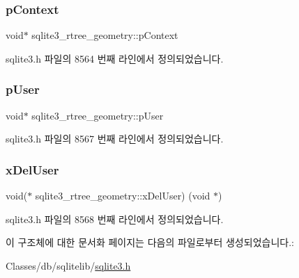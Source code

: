 \subsubsection{\texorpdfstring{p\+Context}{pContext}}
{\footnotesize\ttfamily void$\ast$ sqlite3\+\_\+rtree\+\_\+geometry\+::p\+Context}



sqlite3.\+h 파일의 8564 번째 라인에서 정의되었습니다.

\mbox{\label{structsqlite3__rtree__geometry_add62e1cd5faa6000c815104af3c540d0}} 
\subsubsection{\texorpdfstring{p\+User}{pUser}}
{\footnotesize\ttfamily void$\ast$ sqlite3\+\_\+rtree\+\_\+geometry\+::p\+User}



sqlite3.\+h 파일의 8567 번째 라인에서 정의되었습니다.

\mbox{\label{structsqlite3__rtree__geometry_ae9835a39924a75b33cce9f6b10e1813f}} 
\subsubsection{\texorpdfstring{x\+Del\+User}{xDelUser}}
{\footnotesize\ttfamily void($\ast$ sqlite3\+\_\+rtree\+\_\+geometry\+::x\+Del\+User) (void $\ast$)}



sqlite3.\+h 파일의 8568 번째 라인에서 정의되었습니다.



이 구조체에 대한 문서화 페이지는 다음의 파일로부터 생성되었습니다.\+:\begin{DoxyCompactItemize}
\item 
Classes/db/sqlitelib/\hyperlink{sqlite3_8h}{sqlite3.\+h}\end{DoxyCompactItemize}

